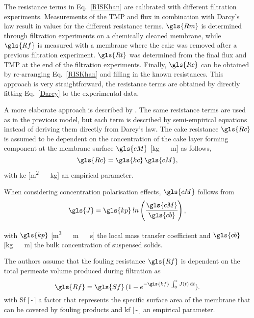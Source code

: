 The resistance terms in Eq.\ \eqref{RISKhan} are calibrated with different filtration experiments.
Measurements of the \gls{TMP} and flux in combination with Darcy's law result in values for the different resistance terms. $\gls{Rm}$ is determined through filtration experiments on a chemically cleaned membrane, while $\gls{Rf}$ is measured with a membrane where the cake was removed after a previous filtration experiment. $\gls{Rt}$ was determined from the final flux and \gls{TMP} at the end of the filtration experiments. Finally, $\gls{Rc}$ can be obtained by re-arranging Eq.\ \eqref{RISKhan} and filling in the known resistances. This approach is very straightforward, the resistance terms are obtained by directly fitting Eq.\ \eqref{Darcy} to the experimental data. \par
A more elaborate approach is described by \cite{Wintgens2003}. The same resistance terms %
are used as in the previous model, but each term is described by semi-empirical equations instead of deriving them directly from Darcy's law. The cake resistance $\gls{Rc}$ is assumed to be dependent on the concentration of the cake layer forming component at the membrane surface $\gls{cM}$ [\unit{\kilogram\, \rpcubic\metre}] as follows,
\begin{equation}
\gls{Rc} = \gls{kc}\, \gls{cM}
\label{RcWint} ,
\end{equation}
with \gls{kc} [\unit{\metre\squared\, \reciprocal\kilogram}] an empirical parameter. \par
When considering concentration polarisation effects, $\gls{cM}$ follows from
\begin{equation}
\gls{J} = \gls{kp}\, ln \left(\cfrac{\gls{cM}}{\gls{cb}} \right)
\label{polarisationWint} ,
\end{equation}

with $\gls{kp}$ [\unit{\cubic\metre\, \rpsquare\metre\, \reciprocal\second}] the local mass transfer coefficient and $\gls{cb}$ [\unit{\kilogram\, \rpcubic\metre}] the bulk concentration of suspensed solids. \par
The authors assume that the fouling resistance $\gls{Rf}$ is dependent on the total permeate volume produced during filtration as
\begin{equation}
\gls{Rf} = \gls{Sf}\, (1-e^{-\gls{kf}\, \int_0^t J(t)\, \mathrm{d}t})
\label{foulingWint} .
\end{equation}
with \gls{Sf} [\,-\,] a factor that represents the specific surface area of the membrane that can be covered by fouling products and \gls{kf} [\,-\,] an empirical parameter. \par

